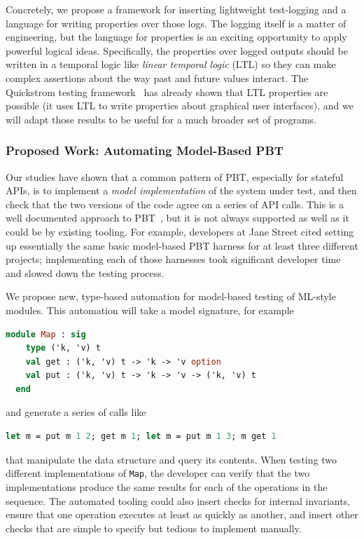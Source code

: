 Concretely, we propose a framework for inserting lightweight test-logging and a
language for writing properties over those logs. The logging itself is a matter
of engineering, but the language for properties is an exciting opportunity to
apply powerful logical ideas. Specifically, the properties over logged outputs
should be written in a temporal logic like {\em linear temporal logic} (LTL) so
they can make complex assertions about the way past and future values interact.
The Quickstrom testing framework~\cite{oconnor_quickstrom_2022} has already shown that
LTL properties are possible (it uses LTL to write properties about graphical
user interfaces), and we will adapt those results to be useful for a much
broader set of programs.

\subsubsection{Proposed Work: Automating Model-Based PBT}
Our studies have shown that a common pattern of PBT, especially for stateful
APIs, is to implement a {\em model implementation} of the system under test, and
then check that the two versions of the code agree on a series of API calls.
This is a well documented approach to PBT~\cite{hughes_experiences_2016}, but it
is not always supported as well as it could be by existing tooling. For example,
developers at Jane Street cited setting up essentially the same basic
model-based PBT harness for at least three different projects; implementing each
of those harnesses took significant developer time and slowed down the testing
process.

We propose new, type-based automation for model-based testing of ML-style
modules. This automation will take a model signature, for example
\begin{lstlisting}[language=Caml]
  module Map : sig
    type ('k, 'v) t
    val get : ('k, 'v) t -> 'k -> 'v option
    val put : ('k, 'v) t -> 'k -> 'v -> ('k, 'v) t
  end
\end{lstlisting}
and generate a series of calls like
\begin{lstlisting}[language=Caml]
  let m = put m 1 2; get m 1; let m = put m 1 3; m get 1
\end{lstlisting}
that manipulate the data structure and query its contents. When testing two
different implementations of \lstinline{Map}, the developer can verify that the
two implementations produce the same results for each of the operations in the
sequence. The automated tooling could also insert checks for internal
invariants, ensure that one operation executes at least as quickly as another,
and insert other checks that are simple to specify but tedious to implement
manually.

